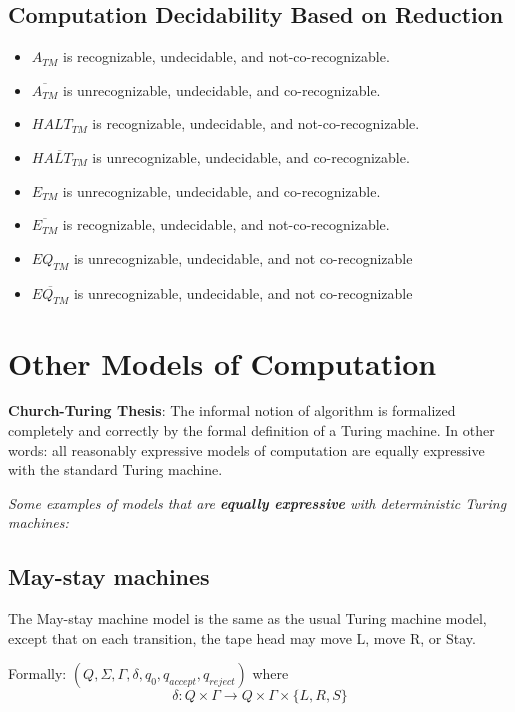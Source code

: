 \documentclass{article}
\begin{document}
        \subsection{Computation Decidability Based on Reduction}
        \begin{itemize}
        \item $A_{TM}$ is recognizable, undecidable, and not-co-recognizable.
        \item $\overline{A_{TM}}$ is unrecognizable, undecidable, and co-recognizable.
        \item $HALT_{TM}$ is recognizable, undecidable, and not-co-recognizable.
        \item $\overline{HALT_{TM}}$ is unrecognizable, undecidable, and co-recognizable.
        \item $E_{TM}$ is unrecognizable, undecidable, and co-recognizable.
        \item $\overline{E_{TM}}$ is recognizable, undecidable, and not-co-recognizable.
        \item $EQ_{TM}$ is unrecognizable, undecidable, and not co-recognizable
        \item $\overline{EQ_{TM}}$ is unrecognizable, undecidable, and not co-recognizable
        \end{itemize}
        \newpage
        \section{Other Models of Computation}
        \label{sec:otherModels}
        {\bf  Church-Turing Thesis}: The informal notion of algorithm is formalized completely  and correctly by the 
formal definition of a  Turing machine. In other words: all reasonably expressive models of 
computation are equally expressive with the standard Turing machine.


\begin{center}
{\large \it  Some examples of models that are {\bf equally expressive} with deterministic Turing machines: }
\end{center}
\subsection{May-stay machines }
The May-stay machine model is the same as the usual Turing machine model,  except that
on each transition, the tape head may move L, move R, or Stay. 

Formally: $(Q, \Sigma, \Gamma, \delta, q_0, q_{accept}, q_{reject})$ where 
\[
  \delta: Q \times \Gamma \to Q \times \Gamma \times \{L, R, S\}
\]
\end{document}
